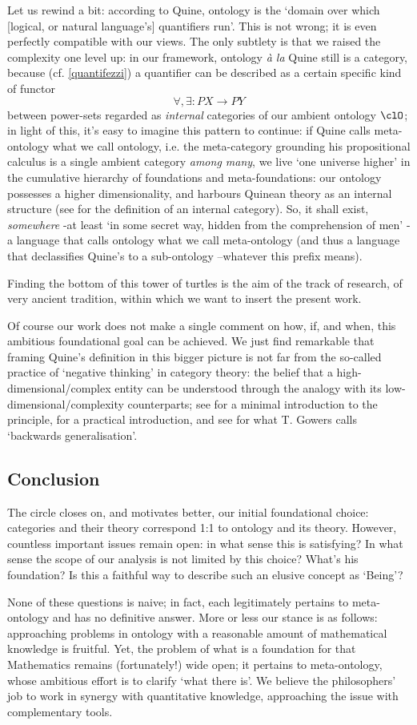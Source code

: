 Let us rewind a bit: according to Quine, ontology is the `domain over which [logical, or natural language's] quantifiers run'. This is not wrong; it is even perfectly compatible with our views. The only subtlety is that we raised the complexity one level up: in our framework, ontology \emph{à la} Quine still is a category, because (cf. \autoref{quantifezzi}) a quantifier can be described as a certain specific kind of functor
\[\forall,\exists : PX \to PY\]
between power-sets regarded as \emph{internal} categories of our ambient ontology $\clO$; in light of this, it's easy to imagine this pattern to continue: if Quine calls meta-ontology what we call ontology, i.e. the meta-category grounding his propositional calculus is a single ambient category \emph{among many}, we live `one universe higher' in the cumulative hierarchy of foundations and meta-foundations: our ontology possesses a higher dimensionality, and harbours Quinean theory as an internal structure (see \cite[Ch. 8]{Bor1} for the definition of an internal category). So, it shall exist, \emph{somewhere} -at least `in some secret way, hidden from the comprehension of men' \cite{Borges1963}- a language that calls ontology what we call meta-ontology (and thus a language that declassifies Quine's to a sub-ontology --whatever this prefix means).

Finding the bottom of this tower of turtles is the aim of the track of research, of very ancient tradition, within which we want to insert the present work.

Of course our work does not make a single comment on how, if, and when, this ambitious foundational goal can be achieved. We just find remarkable that framing Quine's definition in this bigger picture is not far from the so-called practice of `negative thinking' in category theory: the belief that a high-dimensional/complex entity can be understood through the analogy with its low-dimensional/complexity counterparts; see \cite{nlab:category-order,nlab:neg-think} for a minimal introduction to the principle, \cite{baez2010lectures} for a practical introduction, and see \cite{gowers2007} for what T. Gowers calls `backwards generalisation'.
\subsection{Conclusion}
The circle closes on, and motivates better, our initial foundational choice: categories and their theory correspond 1:1 to ontology and its theory. However, countless important issues remain open: in what sense this is satisfying? In what sense the scope of our analysis is not limited by this choice? What's his foundation? Is this a faithful way to describe such an elusive concept as `Being'?

None of these questions is naive; in fact, each legitimately pertains to meta-ontology and has no definitive answer. More or less our stance is as follows: approaching problems in ontology with a reasonable amount of mathematical knowledge is fruitful. Yet, the problem of what is a foundation for that Mathematics remains (fortunately!) wide open; it pertains to meta-ontology, whose ambitious effort is to clarify `what there is'. We believe the philosophers' job to work in synergy with quantitative knowledge, approaching the issue with complementary tools.